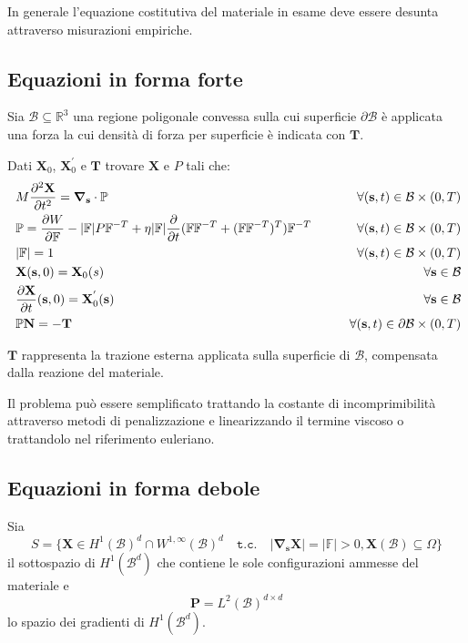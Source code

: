In generale l'equazione costitutiva del materiale in esame deve essere desunta attraverso misurazioni empiriche.


\subsection{Equazioni in forma forte}

Sia $\mathcal{B} \subseteq \mathbb{R}^3$ una regione poligonale convessa sulla cui superficie $\partial\mathcal{B}$ è applicata una forza la cui densità di forza per superficie è indicata con $\mathbf{T}$.

Dati $\mathbf{X}_0$, $\mathbf{X}^{'}_0$ e $\mathbf{T}$ trovare $\mathbf{X}$ e $P$ tali che:
\begin{align*}
&M\frac{\partial^2\mathbf{X}}{\partial t^2} = \boldsymbol{\nabla}_\mathbf{s} \cdot \mathbb{P} &\qquad \forall(\mathbf{s},t)\in\mathcal{B}\times(0,T)\\
&\mathbb{P} = \frac{\partial W}{\partial\mathbb{F}} - \vert\mathbb{F}\vert P\mathbb{F}^{-T} + \eta\vert\mathbb{F}\vert \frac{\partial}{\partial t}(\mathbb{F}\mathbb{F}^{-T} + (\mathbb{F}\mathbb{F}^{-T})^T)\mathbb{F}^{-T}&\qquad \forall(\mathbf{s},t)\in\mathcal{B}\times(0,T)\\\
&\vert\mathbb{F}\vert =1&\qquad \forall(\mathbf{s},t)\in\mathcal{B}\times(0,T)\\\
&\mathbf{X}(\mathbf{s},0)=\mathbf{X}_0(s)&\qquad \forall\mathbf{s}\in\mathcal{B}\\\
&\frac{\partial \mathbf{X}}{\partial t}(\mathbf{s},0)=\mathbf{X}^{'}_0(\mathbf{s})&\qquad \forall\mathbf{s}\in\mathcal{B}\\
&\mathbb{P}\mathbf{N}=-\mathbf{T}&\qquad \forall(\mathbf{s},t)\in\partial\mathcal{B}\times(0,T)
\end{align*}

$\mathbf{T}$ rappresenta la trazione esterna applicata sulla superficie di $\mathcal{B}$, compensata dalla reazione del materiale.

Il problema può essere semplificato trattando la costante di incomprimibilità attraverso metodi di penalizzazione e linearizzando il termine viscoso o trattandolo nel riferimento euleriano.

\subsection{Equazioni in forma debole}

Sia
\begin{equation*}
S = \{ \mathbf{X} \in H^1(\mathcal{B})^d \cap W^{1,\infty}(\mathcal{B})^d \quad \texttt{t.c.} \quad \vert \boldsymbol {\nabla}_{\mathbf{s}}\mathbf{X}\vert = \vert \mathbb{F} \vert > 0, \mathbf{X}(\mathcal{B}) \subseteq \Omega \}
\end{equation*}
il sottospazio di $H^1(\mathcal{B}^d)$ che contiene le sole configurazioni ammesse del materiale e
\begin{equation*}
\mathbf{P} = L^2(\mathcal{B})^{d\times d}
\end{equation*}
lo spazio dei gradienti di $H^1(\mathcal{B}^d)$.

